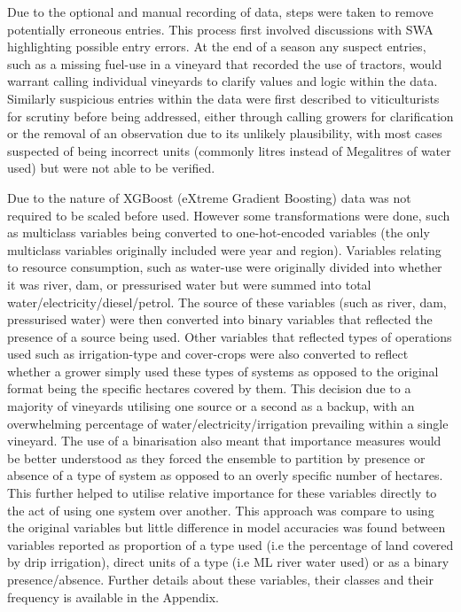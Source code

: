 \documentclass[review,12pt,authoryear]{elsarticle}
\begin{document}
\begin{linenumbers}
Due to the optional and manual recording of data, steps were taken to remove potentially erroneous entries. This process first involved discussions with SWA highlighting possible entry errors. At the end of a season any suspect entries, such as a missing fuel-use in a vineyard that recorded the use of tractors, would warrant calling individual vineyards to clarify values and logic within the data. Similarly suspicious entries within the data were first described to viticulturists for scrutiny before being addressed, either through calling growers for clarification or the removal of an observation due to its unlikely plausibility, with most cases suspected of being incorrect units (commonly litres instead of Megalitres of water used) but were not able to be verified.
\par
Due to the nature of XGBoost (eXtreme Gradient Boosting) data was not required to be scaled before used. However some transformations were done, such as multiclass variables being converted to one-hot-encoded variables (the only multiclass variables originally included were year and region). Variables relating to resource consumption, such as water-use were originally divided into whether it was river, dam, or pressurised water but were summed into total water/electricity/diesel/petrol. The source of these variables (such as river, dam, pressurised water) were then converted into binary variables that reflected the presence of a source being used. Other variables that reflected types of operations used such as irrigation-type and cover-crops were also converted to reflect whether a grower simply used these types of systems as opposed to the original format being the specific hectares covered by them. This decision due to a majority of vineyards utilising one source or a second as a backup, with an overwhelming percentage of water/electricity/irrigation prevailing within a single vineyard. The use of a binarisation also meant that importance measures would be better understood as they forced the ensemble to partition by presence or absence of a type of system as opposed to an overly specific number of hectares. This further helped to utilise relative importance for these variables directly to the act of using one system over another. This approach was compare to using the original variables but little difference in model accuracies was found between variables reported as proportion of a type used (i.e the percentage of land covered by drip irrigation), direct units of a type (i.e ML river water used) or as a binary presence/absence. Further details about these variables, their classes and their frequency is available in the Appendix.


\end{linenumbers}
\end{document}
